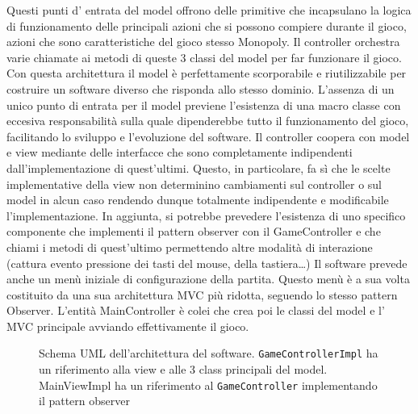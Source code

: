 Questi punti d’ entrata del model offrono delle primitive che incapsulano la logica di funzionamento 
delle principali azioni che si possono compiere durante il gioco, azioni che sono caratteristiche del 
gioco stesso Monopoly. Il controller orchestra varie chiamate ai metodi di queste 3 classi del model per far funzionare
il gioco.
Con questa architettura il model è perfettamente scorporabile e riutilizzabile per costruire 
un software diverso che risponda allo stesso dominio. L'assenza di un unico punto di entrata per il model
previene l'esistenza di una macro classe con eccesiva responsabilità sulla quale dipenderebbe tutto il funzionamento
del gioco, facilitando lo sviluppo e l'evoluzione del software.\newline
Il controller coopera con model e view mediante delle interfacce che sono completamente indipendenti 
dall’implementazione di quest’ultimi. 
Questo, in particolare, fa sì che le scelte implementative della view non determinino cambiamenti sul 
controller o sul model in alcun caso rendendo dunque totalmente
indipendente e modificabile l'implementazione.
In aggiunta, si potrebbe prevedere l'esistenza di uno specifico componente che implementi il pattern observer con il GameController
e che chiami i metodi di quest'ultimo permettendo altre modalità di interazione (cattura evento pressione dei tasti del mouse, della tastiera\dots)
Il software prevede anche un menù iniziale di configurazione della partita. 
Questo menù è a sua volta costituito da una sua architettura MVC più ridotta, 
seguendo lo stesso pattern Observer. 
L’entità MainController è colei che crea poi le classi del model e l' MVC principale avviando effettivamente il gioco.

\begin{figure}[H]
    \centering
    \caption{Schema UML dell'architettura del software. \texttt{GameControllerImpl} ha un riferimento alla view
    e alle 3 class principali del model. MainViewImpl ha un riferimento al \texttt{GameController}
    implementando il pattern observer}
	\label{img:architecture_diagram}
\end{figure}